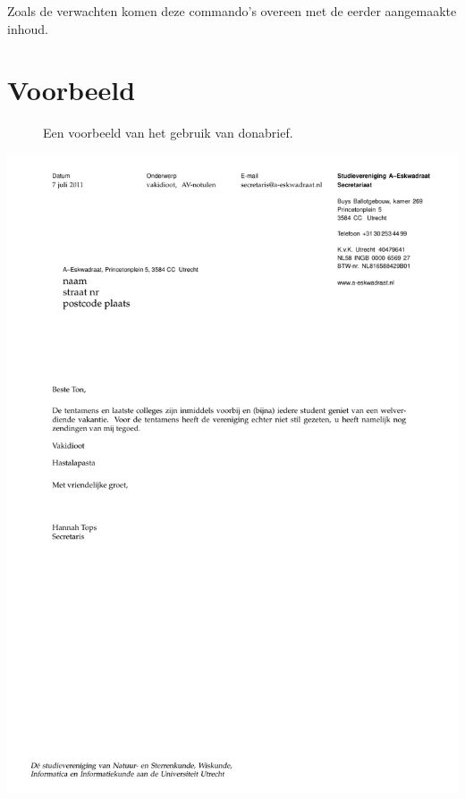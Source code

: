 \documentclass{article}
\begin{document}






Zoals de verwachten komen deze commando's overeen met de eerder aangemaakte inhoud.
\section{Voorbeeld}
\begin{figure}
\fbox{%
\begin{minipage}{\textwidth}

\end{minipage}%
}
\caption{Een voorbeeld van het gebruik van donabrief.}
\label{fig:code}
\end{figure}

\includegraphics[height=.75\textheight]{donabrief-voorbeeld.pdf}
\end{document}
